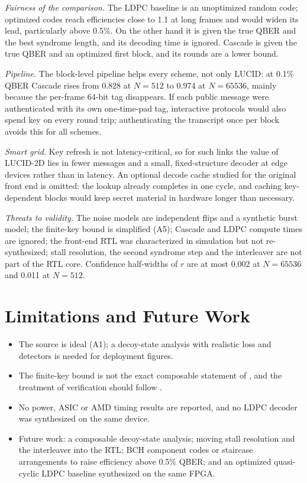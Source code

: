 \documentclass[conference]{IEEEtran}
\begin{document}
\textit{Fairness of the comparison.} The LDPC baseline is an unoptimized random code; optimized codes reach efficiencies close to 1.1 at long frames \cite{elkouss2009,elkouss2011,mao2019} and would widen its lead, particularly above 0.5\%. On the other hand it is given the true QBER and the best syndrome length, and its decoding time is ignored. Cascade is given the true QBER and an optimized first block, and its rounds are a lower bound.

\textit{Pipeline.} The block-level pipeline helps every scheme, not only LUCID: at 0.1\% QBER Cascade rises from 0.828 at $N=512$ to 0.974 at $N=65536$, mainly because the per-frame 64-bit tag disappears. If each public message were authenticated with its own one-time-pad tag, interactive protocols would also spend key on every round trip; authenticating the transcript once per block avoids this for all schemes.

\textit{Smart grid.} Key refresh is not latency-critical, so for such links the value of LUCID-2D lies in fewer messages and a small, fixed-structure decoder at edge devices rather than in latency. An optional decode cache studied for the original front end is omitted: the lookup already completes in one cycle, and caching key-dependent blocks would keep secret material in hardware longer than necessary.

\textit{Threats to validity.} The noise models are independent flips and a synthetic burst model; the finite-key bound is simplified (A5); Cascade and LDPC compute times are ignored; the front-end RTL was characterized in simulation but not re-synthesized; stall resolution, the second syndrome step and the interleaver are not part of the RTL core. Confidence half-widths of $r$ are at most 0.002 at $N=65536$ and 0.011 at $N=512$.

\section{Limitations and Future Work}\label{sec:limits}
\begin{itemize}
\item The source is ideal (A1); a decoy-state analysis \cite{lim2014} with realistic loss and detectors is needed for deployment figures.
\item The finite-key bound is not the exact composable statement of \cite{tomamichel2012}, and the treatment of verification should follow \cite{tsurumaru2025}.
\item No power, ASIC or AMD timing results are reported, and no LDPC decoder was synthesized on the same device.
\item Future work: a composable decoy-state analysis; moving stall resolution and the interleaver into the RTL; BCH component codes or staircase arrangements \cite{smith2012} to raise efficiency above 0.5\% QBER; and an optimized quasi-cyclic LDPC baseline synthesized on the same FPGA.
\end{itemize}
\end{document}
